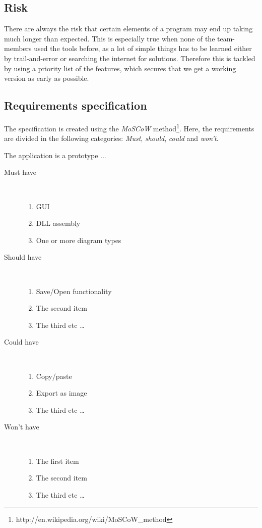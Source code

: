 \subsection{Risk}
There are always the risk that certain elements of a program may end up taking
much longer than expected. This is especially true when none of the team-members
used the tools before, as a lot of simple things has to be learned either by
trail-and-error or searching the internet for solutions. Therefore this is
tackled by using a priority list of the features, which secures that we get a
working version as early as possible.

\newpage
\subsection{Requirements specification}
The specification is created using the \textit{MoSCoW} 
method\footnote{http://en.wikipedia.org/wiki/MoSCoW\_method}. Here, the 
requirements 
are divided in the following categories: \textit{Must}, \textit{should}, 
\textit{could} and 
\textit{won't}.

The application is a prototype ...

\begin{description}
	\item[Must have] \hfill \\
	\begin{enumerate}
		\item GUI
		\item DLL assembly
		\item One or more diagram types
	\end{enumerate}
	\item[Should have] \hfill \\
	\begin{enumerate}
		\item Save/Open functionality
		\item The second item
		\item The third etc \ldots
	\end{enumerate}
	\item[Could have] \hfill \\
	\begin{enumerate}
		\item Copy/paste
		\item Export as image
		\item The third etc \ldots
	\end{enumerate}
	\item[Won't have] \hfill \\
	\begin{enumerate}
		\item The first item
		\item The second item
		\item The third etc \ldots
	\end{enumerate}
\end{description}





